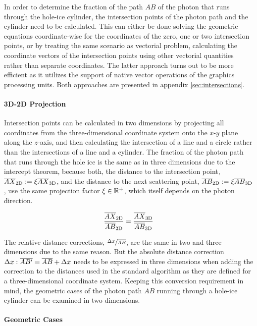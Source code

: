 In order to determine the fraction of the path \(AB\) of the photon that
runs through the hole-ice cylinder, the intersection points of the
photon path and the cylinder need to be calculated. This can either be
done solving the geometric equations coordinate-wise for the coordinates
of the zero, one or two intersection points, or by treating the same
scenario as vectorial problem, calculating the coordinate vectors of the
intersection points using other vectorial quantities rather than
separate coordinates. The latter approach turns out to be more efficient
as it utilizes the support of native vector operations of the graphics
processing units. Both approaches are presented in appendix
\ref{sec:intersections}.

\paragraph{3D-2D Projection}

Intersection points can be calculated in two dimensions by projecting
all coordinates from the three-dimensional coordinate system onto the
\(x\)-\(y\) plane along the \(z\)-axis, and then calculating the
intersection of a line and a circle rather than the intersections of a
line and a cylinder. The fraction of the photon path that runs through
the hole ice is the same as in three dimensions due to the intercept
theorem, because both, the distance to the intersection point,
\(\overline{AX}_\text{2D}:=\xi \overline{AX}_\text{3D}\), and the distance to the
next scattering point, \(\overline{AB}_\text{2D}:=\xi \overline{AB}_\text{3D}\),
use the same projection factor \(\xi \in \mathbb{R}^+\), which itself
depends on the photon direction.

\[
  \frac{\overline{AX}_\text{2D}}{\overline{AB}_\text{2D}} = \frac{\overline{AX}_\text{3D}}{\overline{AB}_\text{3D}}
\]

The relative distance corrections, \(\sfrac{\Delta x}{\overline{AB}}\), are
the same in two and three dimensions due to the same reason. But the
absolute distance correction
\(\Delta x : \overline{AB'} = \overline{AB} + \Delta x\) needs to be expressed in
three dimensions when adding the correction to the distances used in the
standard algorithm as they are defined for a three-dimensional
coordinate system. Keeping this conversion requirement in mind, the
geometric cases of the photon path \(AB\) running through a hole-ice
cylinder can be examined in two dimensions.

\paragraph{Geometric Cases}

